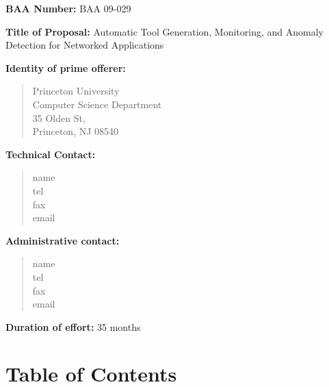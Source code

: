 \documentclass[12pt]{article}
\begin{document}
{\bf BAA Number:} BAA 09-029

\vspace{.5in}

{\bf Title of Proposal:}  
Automatic Tool Generation, Monitoring, and Anomaly Detection for Networked Applications

\vspace{.5in}

{\bf Identity of prime offerer:}
\begin{quote}
Princeton University \\
Computer Science Department \\
35 Olden St, \\
Princeton, NJ 08540
\end{quote}

\vspace{.5in}

{\bf Technical Contact:}  
\begin{quote}
name \\
tel \\
fax \\
email \\
\end{quote}

\vspace{.5in}

{\bf Administrative contact:}
\begin{quote}
name \\
tel \\
fax \\
email \\
\end{quote}

\vspace{.5in}

{\bf Duration of effort:} 35 months

\newpage

\setcounter{page}{1}
\appendix

\section{Table of Contents}
\tableofcontents\
\newpage
\pagenumbering{arabic}
\setcounter{page}{1}
\end{document}
